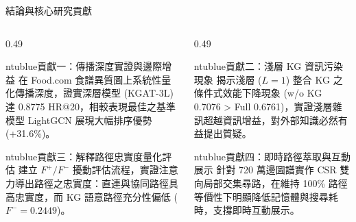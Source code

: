 \documentclass[aspectratio=169, 10pt]{beamer}
\begin{document}
\begin{frame}{結論與核心研究貢獻}
  \begin{columns}[t]
    \begin{column}{0.49\textwidth}
      \begin{mybox}[fonttitle=\footnotesize\bfseries, height=2.35cm]{ntublue}{{貢獻一：傳播深度實證與邊際增益}}
        \scriptsize
        在 Food.com 食譜異質圖上系統性量化傳播深度，證實深層模型 (KGAT-3L) 達 0.8775 HR@20，相較表現最佳之基準模型 LightGCN 展現大幅排序優勢 (+31.6\%)。
      \end{mybox}
      \vspace{0.15cm}
      \begin{mybox}[fonttitle=\footnotesize\bfseries, height=2.35cm]{ntublue}{{貢獻三：解釋路徑忠實度量化評估}}
        \scriptsize
        建立 $F^+ / F^-$ 擾動評估流程，實證注意力導出路徑之忠實度：直連與協同路徑具高忠實度，而 KG 語意路徑充分性偏低 ($F^- = 0.2449$)。
      \end{mybox}
    \end{column}

    \begin{column}{0.49\textwidth}
      \begin{mybox}[fonttitle=\footnotesize\bfseries, height=2.35cm]{ntublue}{{貢獻二：淺層 KG 資訊污染現象}}
        \scriptsize
        揭示淺層 ($L=1$) 整合 KG 之條件式效能下降現象 (w/o KG 0.7076 > Full 0.6761)，實證淺層雜訊超越資訊增益，對外部知識必然有益提出質疑。
      \end{mybox}
      \vspace{0.15cm}
      \begin{mybox}[fonttitle=\footnotesize\bfseries, height=2.35cm]{ntublue}{{貢獻四：即時路徑萃取與互動展示}}
        \scriptsize
        針對 720 萬邊圖譜實作 CSR 雙向局部交集尋路，在維持 100\% 路徑等價性下明顯降低記憶體與搜尋耗時，支撐即時互動展示。
      \end{mybox}
    \end{column}
  \end{columns}
\end{frame}
\end{document}
